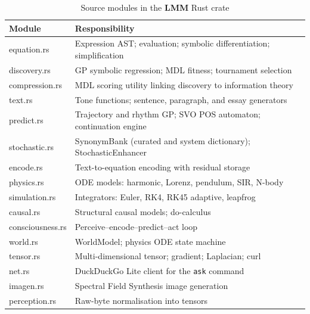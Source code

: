 \documentclass[11pt,a4paper]{article}
\newcommand{\lmm}{\texorpdfstring{%
  \textbf{\color{lmmAccent}LMM}}{LMM}}
\begin{document}
\begin{table}[H]
\centering
\caption{Source modules in the \lmm{} Rust crate}
\label{tab:modules}
\renewcommand{\arraystretch}{1.3}
\begin{tabularx}{\linewidth}{@{}>{\ttfamily\small}p{3.2cm} X@{}}
\toprule
\rowcolor{lmmHeaderBg}
{\color{white}\normalfont\textbf{Module}} &
{\color{white}\textbf{Responsibility}} \\
\midrule
\rowcolor{white}     equation.rs      & Expression AST; evaluation; symbolic differentiation; simplification \\
\rowcolor{lmmRowAlt} discovery.rs     & GP symbolic regression; MDL fitness; tournament selection \\
\rowcolor{white}     compression.rs   & MDL scoring utility linking discovery to information theory \\
\rowcolor{lmmRowAlt} text.rs          & Tone functions; sentence, paragraph, and essay generators \\
\rowcolor{white}     predict.rs       & Trajectory and rhythm GP; SVO POS automaton; continuation engine \\
\rowcolor{lmmRowAlt} stochastic.rs    & SynonymBank (curated and system dictionary); StochasticEnhancer \\
\rowcolor{white}     encode.rs        & Text-to-equation encoding with residual storage \\
\rowcolor{lmmRowAlt} physics.rs       & ODE models: harmonic, Lorenz, pendulum, SIR, N-body \\
\rowcolor{white}     simulation.rs    & Integrators: Euler, RK4, RK45 adaptive, leapfrog \\
\rowcolor{lmmRowAlt} causal.rs        & Structural causal models; do-calculus \\
\rowcolor{white}     consciousness.rs & Perceive--encode--predict--act loop \\
\rowcolor{lmmRowAlt} world.rs         & WorldModel; physics ODE state machine \\
\rowcolor{white}     tensor.rs        & Multi-dimensional tensor; gradient; Laplacian; curl \\
\rowcolor{lmmRowAlt} net.rs           & DuckDuckGo Lite client for the \texttt{ask} command \\
\rowcolor{white}     imagen.rs        & Spectral Field Synthesis image generation \\
\rowcolor{lmmRowAlt} perception.rs    & Raw-byte normalisation into tensors \\
\bottomrule
\end{tabularx}
\end{table}
\end{document}
